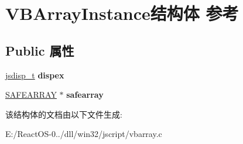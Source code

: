 \hypertarget{struct_v_b_array_instance}{}\section{V\+B\+Array\+Instance结构体 参考}
\label{struct_v_b_array_instance}
\subsection*{Public 属性}
\begin{DoxyCompactItemize}
\item 
\mbox{\label{struct_v_b_array_instance_a2f60a1c17e7d25f5bfbc84835758e0e3}} 
\hyperlink{structjsdisp__t}{jsdisp\+\_\+t} {\bfseries dispex}
\item 
\mbox{\label{struct_v_b_array_instance_ab8f2e8aa5ee24f9f61416c5f5ba4d65c}} 
\hyperlink{structtag_s_a_f_e_a_r_r_a_y}{S\+A\+F\+E\+A\+R\+R\+AY} $\ast$ {\bfseries safearray}
\end{DoxyCompactItemize}


该结构体的文档由以下文件生成\+:\begin{DoxyCompactItemize}
\item 
E\+:/\+React\+O\+S-\/0../dll/win32/jscript/vbarray.\+c\end{DoxyCompactItemize}
